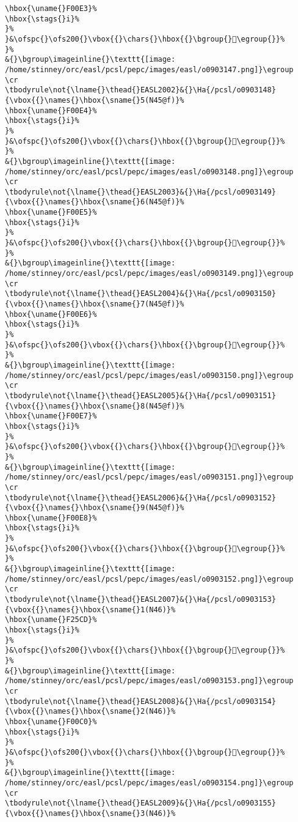 \begin{verbatim}
\hbox{\uname{}F00E3}%
\hbox{\stags{}i}%
}%
}&\ofspc{}\ofs200{}\vbox{{}\chars{}\hbox{{}\bgroup{}󰃣\egroup{}}%
}%
&{}\bgroup\imageinline{}\texttt{[image: /home/stinney/orc/easl/pcsl/pepc/images/easl/o0903147.png]}\egroup
\cr
\tbodyrule\not{\lname{}\thead{}EASL2002}&{}\Ha{/pcsl/o0903148}{\vbox{{}\names{}\hbox{\sname{}5(N45@f)}%
\hbox{\uname{}F00E4}%
\hbox{\stags{}i}%
}%
}&\ofspc{}\ofs200{}\vbox{{}\chars{}\hbox{{}\bgroup{}󰃤\egroup{}}%
}%
&{}\bgroup\imageinline{}\texttt{[image: /home/stinney/orc/easl/pcsl/pepc/images/easl/o0903148.png]}\egroup
\cr
\tbodyrule\not{\lname{}\thead{}EASL2003}&{}\Ha{/pcsl/o0903149}{\vbox{{}\names{}\hbox{\sname{}6(N45@f)}%
\hbox{\uname{}F00E5}%
\hbox{\stags{}i}%
}%
}&\ofspc{}\ofs200{}\vbox{{}\chars{}\hbox{{}\bgroup{}󰃥\egroup{}}%
}%
&{}\bgroup\imageinline{}\texttt{[image: /home/stinney/orc/easl/pcsl/pepc/images/easl/o0903149.png]}\egroup
\cr
\tbodyrule\not{\lname{}\thead{}EASL2004}&{}\Ha{/pcsl/o0903150}{\vbox{{}\names{}\hbox{\sname{}7(N45@f)}%
\hbox{\uname{}F00E6}%
\hbox{\stags{}i}%
}%
}&\ofspc{}\ofs200{}\vbox{{}\chars{}\hbox{{}\bgroup{}󰃦\egroup{}}%
}%
&{}\bgroup\imageinline{}\texttt{[image: /home/stinney/orc/easl/pcsl/pepc/images/easl/o0903150.png]}\egroup
\cr
\tbodyrule\not{\lname{}\thead{}EASL2005}&{}\Ha{/pcsl/o0903151}{\vbox{{}\names{}\hbox{\sname{}8(N45@f)}%
\hbox{\uname{}F00E7}%
\hbox{\stags{}i}%
}%
}&\ofspc{}\ofs200{}\vbox{{}\chars{}\hbox{{}\bgroup{}󰃧\egroup{}}%
}%
&{}\bgroup\imageinline{}\texttt{[image: /home/stinney/orc/easl/pcsl/pepc/images/easl/o0903151.png]}\egroup
\cr
\tbodyrule\not{\lname{}\thead{}EASL2006}&{}\Ha{/pcsl/o0903152}{\vbox{{}\names{}\hbox{\sname{}9(N45@f)}%
\hbox{\uname{}F00E8}%
\hbox{\stags{}i}%
}%
}&\ofspc{}\ofs200{}\vbox{{}\chars{}\hbox{{}\bgroup{}󰃨\egroup{}}%
}%
&{}\bgroup\imageinline{}\texttt{[image: /home/stinney/orc/easl/pcsl/pepc/images/easl/o0903152.png]}\egroup
\cr
\tbodyrule\not{\lname{}\thead{}EASL2007}&{}\Ha{/pcsl/o0903153}{\vbox{{}\names{}\hbox{\sname{}1(N46)}%
\hbox{\uname{}F25CD}%
\hbox{\stags{}i}%
}%
}&\ofspc{}\ofs200{}\vbox{{}\chars{}\hbox{{}\bgroup{}󲗍\egroup{}}%
}%
&{}\bgroup\imageinline{}\texttt{[image: /home/stinney/orc/easl/pcsl/pepc/images/easl/o0903153.png]}\egroup
\cr
\tbodyrule\not{\lname{}\thead{}EASL2008}&{}\Ha{/pcsl/o0903154}{\vbox{{}\names{}\hbox{\sname{}2(N46)}%
\hbox{\uname{}F00C0}%
\hbox{\stags{}i}%
}%
}&\ofspc{}\ofs200{}\vbox{{}\chars{}\hbox{{}\bgroup{}󰃀\egroup{}}%
}%
&{}\bgroup\imageinline{}\texttt{[image: /home/stinney/orc/easl/pcsl/pepc/images/easl/o0903154.png]}\egroup
\cr
\tbodyrule\not{\lname{}\thead{}EASL2009}&{}\Ha{/pcsl/o0903155}{\vbox{{}\names{}\hbox{\sname{}3(N46)}%

\end{verbatim}

